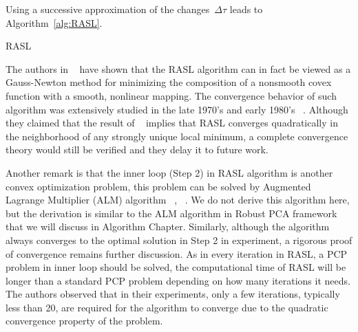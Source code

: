 Using a successive approximation of the changes~$\Delta \tau$ leads to Algorithm~\ref{alg:RASL}.
%
\begin{algorithm}[h!]
\caption{RASL}
\label{alg:RASL}
\end{algorithm}

The authors in ~\cite{Peng:2010} have shown that the RASL algorithm can in fact be viewed as a Gauss-Newton method for minimizing the composition of a nonsmooth covex function with a smooth, nonlinear mapping. The convergence behavior of such algorithm was extensively studied in the late 1970's and early 1980's ~\cite{Jittorntrum:1980qy}. Although they claimed that the result of ~\cite{Jittorntrum:1980qy} implies that RASL converges quadratically in the neighborhood of any strongly unique local minimum, a complete convergence theory would still be verified and they delay it to future work.

Another remark is that the inner loop (Step 2) in RASL algorithm is another convex optimization problem, this problem can be solved by Augmented Lagrange Multiplier (ALM) algorithm ~\cite{Candes:2011fk}, ~\cite{Lin:2009kx}. We do not derive this algorithm here, but the  derivation is similar to the ALM algorithm in Robust PCA framework that we will discuss in Algorithm Chapter. Similarly, although the algorithm always converges to the optimal solution in Step 2 in experiment, a rigorous proof of convergence remains further discussion. As in every iteration in RASL, a PCP problem in inner loop should be solved, the computational time of RASL will be longer than a standard PCP problem depending on how many iterations it needs. The authors observed that in their experiments, only a few iterations, typically less than 20, are required for the algorithm to converge due to the quadratic convergence property of the problem. 

